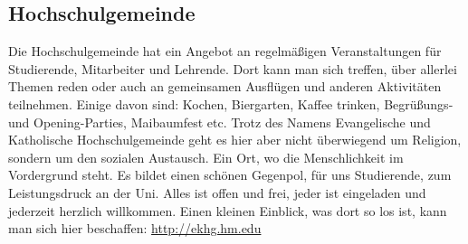 \subsection{Hochschulgemeinde}
Die Hochschulgemeinde hat ein Angebot an regelmäßigen 
Veranstaltungen für Studierende, Mitarbeiter und Lehrende. Dort kann 
man sich treffen, über allerlei Themen reden oder auch an gemeinsamen 
Ausflügen und anderen Aktivitäten teilnehmen. Einige davon sind: 
Kochen, Biergarten, Kaffee trinken, Begrüßungs- und Opening-Parties, 
Maibaumfest etc. \doublebreak
Trotz des Namens \glqq Evangelische und Katholische Hochschulgemeinde\grqq{} 
geht es hier aber nicht überwiegend um Religion, sondern um den 
sozialen Austausch. Ein Ort, wo die Menschlichkeit im Vordergrund 
steht. Es bildet einen schönen Gegenpol, für uns Studierende, zum 
Leistungsdruck an der Uni. \doublebreak
Alles ist offen und frei, jeder ist eingeladen und jederzeit herzlich 
willkommen. \doublebreak
Einen kleinen Einblick, was dort so los ist, kann man sich hier beschaffen: 
\url{http://ekhg.hm.edu} 